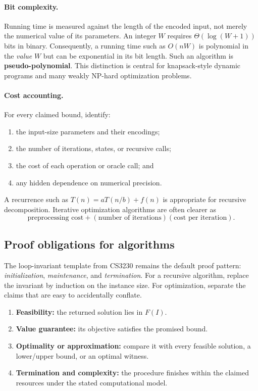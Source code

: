 \documentclass[10pt]{article}
\theoremstyle{definition}
\begin{document}
\paragraph{Bit complexity.}
Running time is measured against the length of the encoded input, not merely
the numerical value of its parameters.  An integer $W$ requires
$\Theta(\log(W+1))$ bits in binary.  Consequently, a running time such as
$O(nW)$ is polynomial in the \emph{value} $W$ but can be exponential in its
bit length.  Such an algorithm is \textbf{pseudo-polynomial}.  This distinction
is central for knapsack-style dynamic programs and many weakly NP-hard
optimization problems.

\paragraph{Cost accounting.}
For every claimed bound, identify:
\begin{enumerate}
  \item the input-size parameters and their encodings;
  \item the number of iterations, states, or recursive calls;
  \item the cost of each operation or oracle call; and
  \item any hidden dependence on numerical precision.
\end{enumerate}
A recurrence such as $T(n)=aT(n/b)+f(n)$ is appropriate for recursive
decomposition.  Iterative optimization algorithms are often clearer as
\[
  \text{preprocessing cost}
  + (\text{number of iterations})(\text{cost per iteration}).
\]

\subsection{Proof obligations for algorithms}

The loop-invariant template from CS3230 remains the default proof pattern:
\emph{initialization}, \emph{maintenance}, and \emph{termination}.  For a
recursive algorithm, replace the invariant by induction on the instance size.
For optimization, separate the claims that are easy to accidentally conflate.

\begin{enumerate}
  \item \textbf{Feasibility:} the returned solution lies in $F(I)$.
  \item \textbf{Value guarantee:} its objective satisfies the promised bound.
  \item \textbf{Optimality or approximation:} compare it with every feasible
        solution, a lower/upper bound, or an optimal witness.
  \item \textbf{Termination and complexity:} the procedure finishes within the
        claimed resources under the stated computational model.
\end{enumerate}
\end{document}
